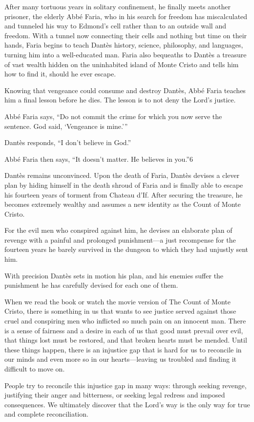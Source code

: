 \documentclass[letterpaper, 11pt]{report}
\begin{document}
After many tortuous years in solitary confinement, he finally meets another prisoner, the elderly Abbé Faria, who in his search for freedom has miscalculated and tunneled his way to Edmond’s cell rather than to an outside wall and freedom. With a tunnel now connecting their cells and nothing but time on their hands, Faria begins to teach Dantès history, science, philosophy, and languages, turning him into a well-educated man. Faria also bequeaths to Dantès a treasure of vast wealth hidden on the uninhabited island of Monte Cristo and tells him how to find it, should he ever escape.

Knowing that vengeance could consume and destroy Dantès, Abbé Faria teaches him a final lesson before he dies. The lesson is to not deny the Lord’s justice.

Abbé Faria says, “Do not commit the crime for which you now serve the sentence. God said, ‘Vengeance is mine.’”

Dantès responds, “I don’t believe in God.”

Abbé Faria then says, “It doesn’t matter. He believes in you.”6

Dantès remains unconvinced. Upon the death of Faria, Dantès devises a clever plan by hiding himself in the death shroud of Faria and is finally able to escape his fourteen years of torment from Chateau d’If. After securing the treasure, he becomes extremely wealthy and assumes a new identity as the Count of Monte Cristo.

For the evil men who conspired against him, he devises an elaborate plan of revenge with a painful and prolonged punishment—a just recompense for the fourteen years he barely survived in the dungeon to which they had unjustly sent him.

With precision Dantès sets in motion his plan, and his enemies suffer the punishment he has carefully devised for each one of them.

When we read the book or watch the movie version of The Count of Monte Cristo, there is something in us that wants to see justice served against those cruel and conspiring men who inflicted so much pain on an innocent man. There is a sense of fairness and a desire in each of us that good must prevail over evil, that things lost must be restored, and that broken hearts must be mended. Until these things happen, there is an injustice gap that is hard for us to reconcile in our minds and even more so in our hearts—leaving us troubled and finding it difficult to move on.

People try to reconcile this injustice gap in many ways: through seeking revenge, justifying their anger and bitterness, or seeking legal redress and imposed consequences. We ultimately discover that the Lord’s way is the only way for true and complete reconciliation.
\end{document}

